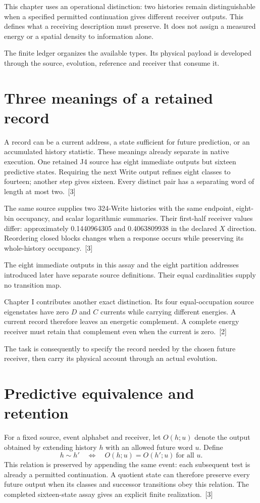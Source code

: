 \documentclass[10pt,twocolumn,letterpaper]{article}
\begin{document}
This chapter uses an operational distinction: two histories remain distinguishable when a specified permitted continuation gives different receiver outputs. This defines what a receiving description must preserve. It does not assign a measured energy or a spatial density to information alone.

The finite ledger organizes the available types. Its physical payload is developed through the source, evolution, reference and receiver that consume it.

\section{Three meanings of a retained record}
A record can be a current address, a state sufficient for future prediction, or an accumulated history statistic. These meanings already separate in native execution. One retained J4 source has eight immediate outputs but sixteen predictive states. Requiring the next Write output refines eight classes to fourteen; another step gives sixteen. Every distinct pair has a separating word of length at most two.~[3]

The same source supplies two 324-Write histories with the same endpoint, eight-bin occupancy, and scalar logarithmic summaries. Their first-half receiver values differ: approximately 0.1440964305 and 0.4063809938 in the declared $X$ direction. Reordering closed blocks changes when a response occurs while preserving its whole-history occupancy.~[3]

The eight immediate outputs in this assay and the eight partition addresses introduced later have separate source definitions. Their equal cardinalities supply no transition map.

Chapter I contributes another exact distinction. Its four equal-occupation source eigenstates have zero $D$ and $C$ currents while carrying different energies. A current record therefore leaves an energetic complement. A complete energy receiver must retain that complement even when the current is zero.~[2]

The task is consequently to specify the record needed by the chosen future receiver, then carry its physical account through an actual evolution.

\section{Predictive equivalence and retention}
For a fixed source, event alphabet and receiver, let $O(h;u)$ denote the output obtained by extending history $h$ with an allowed future word $u$. Define
\[
h\sim h' \quad\Longleftrightarrow\quad O(h;u)=O(h';u)\ \text{for all }u.
\]
This relation is preserved by appending the same event: each subsequent test is already a permitted continuation. A quotient state can therefore preserve every future output when its classes and successor transitions obey this relation. The completed sixteen-state assay gives an explicit finite realization.~[3]
\end{document}
